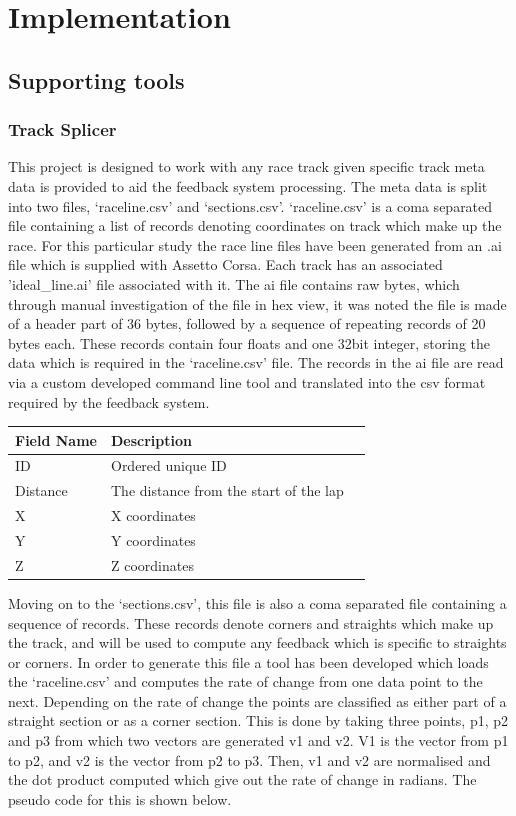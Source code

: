 \section{Implementation}

\subsection{Supporting tools}

\subsubsection{Track Splicer}
This project is designed to work with any race track given specific track meta data is provided to aid the feedback system processing. The meta data is split into two files, ‘raceline.csv’ and ‘sections.csv’. ‘raceline.csv’ is a coma separated file containing a list of records denoting coordinates on track which make up the race. For this particular study the race line files have been generated from an .ai file which is supplied with Assetto Corsa. Each track has an associated 'ideal\_line.ai' file associated with it. The ai file contains raw bytes, which through manual investigation of the file in hex view, it was noted the file is made of a header part of 36 bytes, followed by a sequence of repeating records of 20 bytes each. These records contain four floats and one 32bit integer, storing the data which is required in the ‘raceline.csv’ file. The records in the ai file are read via a custom developed command line tool and translated into the csv format required by the feedback system. 	

\begin{center}
	\begin{tabular}{ | l | l | p{5cm} |}
		\hline
		Field Name & Description \\ \hline
		ID & Ordered unique ID \\ \hline
		Distance & The distance from the start of the lap \\ \hline
		X & X coordinates \\ \hline
		Y & Y coordinates \\ \hline
		Z & Z coordinates \\ \hline
	\end{tabular}
\end{center}

Moving on to the ‘sections.csv’, this file is also a coma separated file containing a sequence of records. These records denote corners and straights which make up the track, and will be used to compute any feedback which is specific to straights or corners. In order to generate this file a tool has been developed which loads the ‘raceline.csv’ and computes the rate of change from one data point to the next. Depending on the rate of change the points are classified as either part of a straight section or as a corner section. This is done by taking three points, p1, p2 and p3 from which two vectors are generated v1 and v2. V1 is the vector from p1 to p2, and v2 is the vector from p2 to p3. Then, v1 and v2 are normalised and the dot product computed which give out the rate of change in radians. The pseudo code for this is shown below.\\

